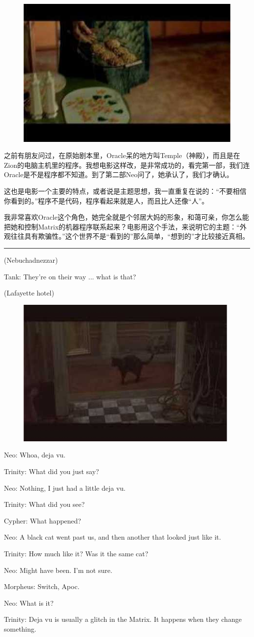\documentclass{ctexart}
\newcommand{\myparsep}{\noindent \rule[0.5ex]{\linewidth}{1pt}}
\newenvironment{myquote}{\color{green} \setlength{\leftskip}{6em} \setlength{\rightskip}{4em} \setlength{\parindent}{-2em}}{\par}
\begin{document}
\begin{figure}[htb]
\centering
\includegraphics[width=0.5\linewidth]{fig/read_Matrix-51}
\end{figure}

之前有朋友问过，在原始剧本里，Oracle呆的地方叫Temple（神殿），而且是在Zion的电脑主机里的程序。我想电影这样改，是非常成功的，看完第一部，我们连Oracle是不是程序都不知道。到了第二部Neo问了，她承认了，我们才确认。

这也是电影一个主要的特点，或者说是主题思想，我一直重复在说的：“不要相信你看到的。”程序不是代码，程序看起来就是人，而且比人还像“人”。

我非常喜欢Oracle这个角色，她完全就是个邻居大妈的形象，和蔼可亲，你怎么能把她和控制Matrix的机器程序联系起来？电影用这个手法，来说明它的主题：“外观往往具有欺骗性。”这个世界不是“看到的”那么简单，“想到的”才比较接近真相。

\myparsep

\begin{myquote}
(Nebuchadnezzar)

Tank: They're on their way ... what is that?

(Lafayette hotel)

\begin{figure}[htb]
\centering
\includegraphics[width=0.5\linewidth]{fig/read_Matrix-53}
\end{figure}

Neo: Whoa, deja vu.

Trinity: What did you just say?

Neo: Nothing, I just had a little deja vu.

Trinity: What did you see?

Cypher: What happened?

Neo: A black cat went past us, and then another that looked just like it.

Trinity: How much like it? Was it the same cat?

Neo: Might have been. I'm not sure.

Morpheus: Switch, Apoc.

Neo: What is it?

Trinity: Deja vu is usually a glitch in the Matrix. It happens when they change something.
\end{myquote}
\end{document}
